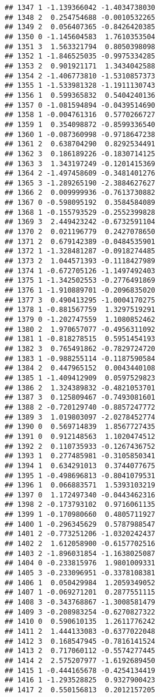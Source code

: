 \documentclass[
]{article}
\begin{document}
\begin{verbatim}
## 1347 1 -1.139366042 -1.4034738030
## 1348 2  0.254754688 -0.0010532265
## 1349 2  0.056407365 -0.8426420385
## 1350 0 -1.145604583  1.7610353504
## 1351 3  1.563321794  0.8050398098
## 1352 1 -1.846525035 -0.9975334285
## 1353 2  0.901921171  1.3434042588
## 1354 2 -1.406773810 -1.5310857373
## 1355 1 -1.533981328 -1.1911130743
## 1356 1  0.599365832  0.5404240136
## 1357 0 -1.081594894 -0.0439514690
## 1358 1 -0.004761316  0.5770266727
## 1359 1  0.354098872 -0.8599336540
## 1360 1 -0.087360998 -0.9718647238
## 1361 2  0.638704290  0.8292534491
## 1362 3  0.186189226 -0.1830714125
## 1363 3  1.343197249 -0.1201415369
## 1364 2 -1.497458609 -0.3481401276
## 1365 3 -1.289265190 -2.3884627627
## 1366 2  0.009999936 -0.7613730882
## 1367 0 -0.598095192  0.3584584089
## 1368 1 -0.155793529 -0.2552399828
## 1369 3  2.449423242 -0.6732591104
## 1370 2  0.021196779  0.2427078650
## 1371 2  0.679142389 -0.0484535901
## 1372 1 -1.328481287 -0.0918274485
## 1373 2  1.044571393 -0.1118427989
## 1374 1 -0.672705126 -1.1497492403
## 1375 1 -1.342502553 -0.2776491869
## 1376 1 -1.910889701 -0.2096835020
## 1377 3  0.490413295 -1.0004170275
## 1378 1 -0.881567759  1.3297519291
## 1379 0 -1.202747559  1.1080852462
## 1380 2  1.970657077 -0.4956311092
## 1381 1 -0.818278515  0.5951454193
## 1382 3  0.765491862 -0.7829724720
## 1383 1 -0.988255114 -0.1187590584
## 1384 2  0.447965152  0.0043440108
## 1385 1 -1.409412909  0.0597529823
## 1386 2  1.324389832 -0.4821053701
## 1387 3  0.125809467 -0.7493081601
## 1388 2 -0.720129740 -0.8857247772
## 1389 3  1.019803097 -2.0278452774
## 1390 0  0.569714839  1.8567727435
## 1391 0  0.912148563  1.1020474512
## 1392 2  0.110735933 -0.1267436752
## 1393 1  0.277485981 -0.3105850341
## 1394 1  0.634291013  0.3744077675
## 1395 1 -0.498696813 -0.8041079531
## 1396 1  0.066883571  1.5393103219
## 1397 0  1.172497340 -0.0443462316
## 1398 2 -0.173793102  0.9716061135
## 1399 1 -0.170980660  0.4805711927
## 1400 1 -0.296345629  0.5787988547
## 1401 2 -0.773251206 -1.0320242437
## 1402 2  1.612058900 -0.6157702516
## 1403 2 -1.896031854 -1.1638025087
## 1404 0 -0.233815976  1.9801009331
## 1405 3 -0.233096951 -0.3378108381
## 1406 1  0.050429984  1.2059349052
## 1407 1 -0.069271201  0.2877551115
## 1408 3 -0.343768867 -1.3008581479
## 1409 3 -0.208983254 -0.6270827322
## 1410 0  0.590610135  1.2611776242
## 1411 2  1.444133083 -0.6377022048
## 1412 3  0.168547945 -0.7816141524
## 1413 2  0.717060112 -0.5574277445
## 1414 2  2.575207977 -1.6192689450
## 1415 1 -0.444165678 -0.4254134419
## 1416 1 -1.293528825  0.9327900423
## 1417 2  0.550156813  0.2012157205

\end{verbatim}
\end{document}
